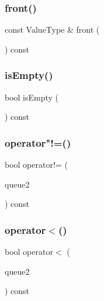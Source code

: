 \subsubsection{\texorpdfstring{front()}{front()}}
{\footnotesize\ttfamily const Value\+Type \& front (\begin{DoxyParamCaption}{ }\end{DoxyParamCaption}) const}

\mbox{\label{classQueue_acf82f9b2937375c7b1cf3dccb3df3312}} 
\subsubsection{\texorpdfstring{is\+Empty()}{isEmpty()}}
{\footnotesize\ttfamily bool is\+Empty (\begin{DoxyParamCaption}{ }\end{DoxyParamCaption}) const}

\mbox{\label{classQueue_a385dafd253f98c0a2cec02b5c077cc2e}} 
\subsubsection{\texorpdfstring{operator"!=()}{operator!=()}}
{\footnotesize\ttfamily bool operator!= (\begin{DoxyParamCaption}\item[{const \mbox{\hyperlink{classQueue}{Queue}}$<$ Value\+Type $>$ \&}]{queue2 }\end{DoxyParamCaption}) const}

\mbox{\label{classQueue_ad2043e6acdbba5a438b040a2ceda3db7}} 
\subsubsection{\texorpdfstring{operator$<$()}{operator<()}}
{\footnotesize\ttfamily bool operator$<$ (\begin{DoxyParamCaption}\item[{const \mbox{\hyperlink{classQueue}{Queue}}$<$ Value\+Type $>$ \&}]{queue2 }\end{DoxyParamCaption}) const}

